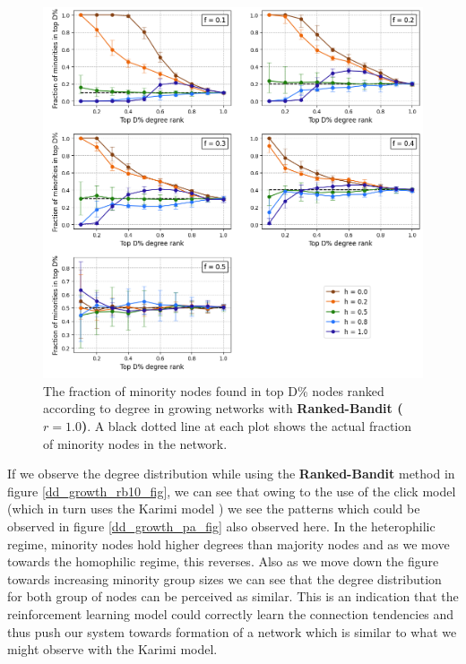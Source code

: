 \begin{figure}[h!]
	\centering
	\includegraphics[trim=0 10 0 5, clip, width=1.0\textwidth]{images/top_growth_rb10.png}
	\caption{The fraction of minority nodes found in top D\% nodes ranked according to degree in growing networks with \textbf{Ranked-Bandit ($r = 1.0$)}. A black dotted line at each plot shows the actual fraction of minority nodes in the network.}
	\label{top_growth_rb10_fig}
\end{figure}

If we observe the degree distribution while using the \textbf{Ranked-Bandit} method in figure \ref{dd_growth_rb10_fig}, we can see that owing to the use of the click model (which in turn uses the Karimi model \cite{karimi2018homophily}) we see the patterns which could be observed in figure \ref{dd_growth_pa_fig} also observed here. In the heterophilic regime, minority nodes hold higher degrees than majority nodes and as we move towards the homophilic regime, this reverses. Also as we move down the figure towards increasing minority group sizes we can see that the degree distribution for both group of nodes can be perceived as similar. This is an indication that the reinforcement learning model could correctly learn the connection tendencies and thus push our system towards formation of a network which is similar to what we might observe with the Karimi model.

